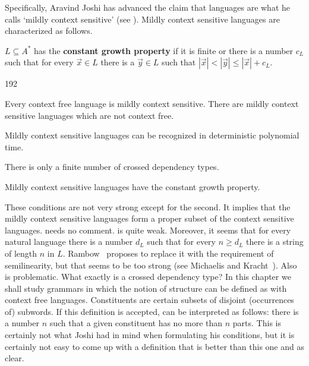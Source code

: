 Specifically, Aravind Joshi 
has advanced the claim that languages 
are what he calls `mildly context sensitive' (see \cite{joshi-1985}). 
Mildly context sensitive languages are characterized as follows.
\begin{defn}
$L \subseteq A^{\ast}$ has the \textbf{constant growth property} 
if it is finite or there is a number $c_L$ such that for every 
$\vec{x}\in L$ there is a $\vec{y}\in L$ such that 
$|\vec{x}| < |\vec{y}| \leq |\vec{x}| + c_L$. 
\end{defn}
\begin{dingautolist}{192}
\item Every context free language is mildly context sensitive.
    There are mildly context sensitive languages which are
    not context free.
\item Mildly context sensitive languages can be recognized in
    deterministic polynomial time.
\item There is only a finite number of crossed dependency types.
\item Mildly context sensitive languages have the constant
    growth property. 
\end{dingautolist}
These conditions are not very strong except for the second.
It implies that the mildly context sensitive languages
form a proper subset of the context sensitive languages.
 needs no comment.  is quite weak.
Moreover, it seems that for every natural language there is a 
number $d_L$ such that for every $n \geq d_L$ there is a string 
of length $n$ in $L$. Rambow~ 
proposes to replace it with the requirement of semilinearity, but 
that seems to be too strong (see Michaelis and 
Kracht~).
Also  is problematic. What exactly is a crossed dependency 
type? In this chapter we shall study grammars in which the notion 
of structure can be defined as with context free languages. 
Constituents are certain subsets of disjoint (occurrences of) 
subwords. If this definition is accepted,  can be 
interpreted as follows: there is a number $n$ such that a given 
constituent has no more than $n$ parts. This is certainly not what Joshi 
had in mind when formulating his conditions, but it is certainly not 
easy to come up with a definition that is better than this one and
as clear.

